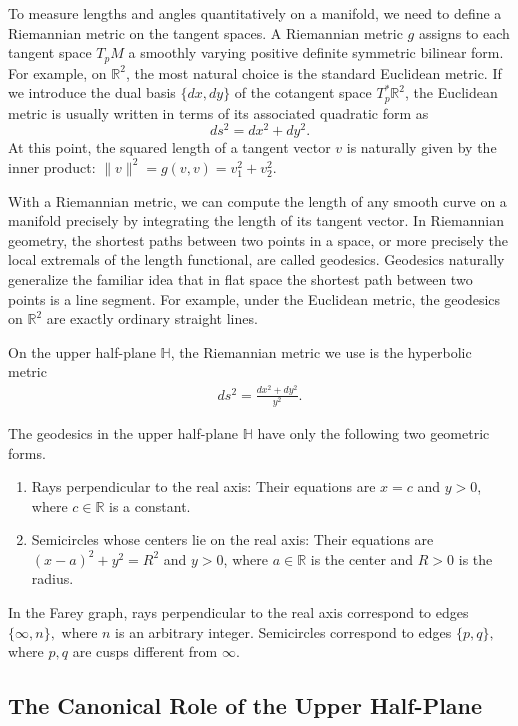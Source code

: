 \documentclass[10pt, a4paper]{article}
\newcommand{\HH}{\mathbb{H}} %
\theoremstyle{definition}
\theoremstyle{remark}
\begin{document}
To measure lengths and angles quantitatively on a manifold, we need to define a Riemannian metric on the tangent spaces. A Riemannian metric \(g\) assigns to each tangent space \(T_p M\) a smoothly varying positive definite symmetric bilinear form.
For example, on \(\mathbb{R}^2\), the most natural choice is the standard Euclidean metric.
If we introduce the dual basis \(\{dx, dy\}\) of the cotangent space \(T_p^*\mathbb{R}^2\), the Euclidean metric is usually written in terms of its associated quadratic form as $$ds^2 = dx^2 + dy^2.$$ At this point, the squared length of a tangent vector \(v\) is naturally given by the inner product: \(\|v\|^2 = g(v,v) = v_1^2 + v_2^2\).

With a Riemannian metric, we can compute the length of any smooth curve on a manifold precisely by integrating the length of its tangent vector.
In Riemannian geometry, the shortest paths between two points in a space, or more precisely the local extremals of the length functional, are called geodesics.
Geodesics naturally generalize the familiar idea that in flat space the shortest path between two points is a line segment.
For example, under the Euclidean metric, the geodesics on \(\mathbb{R}^2\) are exactly ordinary straight lines.

On the upper half-plane \(\HH\), the Riemannian metric we use is the hyperbolic metric
\begin{align*}
     ds^2 = \frac{dx^2 + dy^2}{y^2}.
\end{align*}

The geodesics in the upper half-plane \(\mathbb{H}\) have only the following two geometric forms.
\begin{enumerate}
    \item Rays perpendicular to the real axis: Their equations are \(x = c\) and \(y > 0\), where \(c \in \mathbb{R}\) is a constant.
    \item Semicircles whose centers lie on the real axis: Their equations are \((x-a)^2 + y^2 = R^2\) and \(y > 0\), where \(a \in \mathbb{R}\) is the center and \(R > 0\) is the radius.
\end{enumerate}

In the Farey graph, rays perpendicular to the real axis correspond to edges \(\{\infty,n\}, \) where \(n\) is an arbitrary integer. Semicircles correspond to edges \(\{p,q\}, \) where \(p,q\) are cusps different from \(\infty\).

\subsection{The Canonical Role of the Upper Half-Plane}
\end{document}
